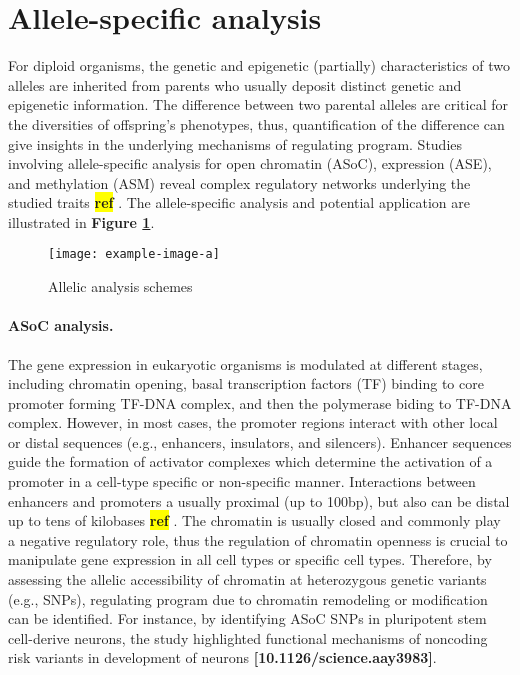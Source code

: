 \documentclass[12pt,usletter, fancy]{elegantbook}
\newcommand{\reqref}[1][ref]{
  \colorbox{yellow}{\textbf{#1}}
}
\begin{document}
\section*{Allele-specific analysis}
For diploid organisms, the genetic and epigenetic (partially) characteristics of two alleles are inherited from parents who usually deposit distinct genetic and epigenetic information.
The difference between two parental alleles are critical for the diversities of offspring's phenotypes, thus, quantification of the difference can give insights in the underlying mechanisms of regulating program.
Studies involving allele-specific analysis for open chromatin (ASoC), expression (ASE), and methylation (ASM) reveal complex regulatory networks underlying the studied traits\reqref.
The allele-specific analysis and potential application are illustrated in \textbf{Figure \ref{fig:example-image-a}}.
\begin{figure}[h]
  \centering
  \texttt{[image: example-image-a]}
  \vspace*{0.2cm}
  \caption{Allelic analysis schemes}
  \label{fig:example-image-a}
\end{figure}
\paragraph*{ASoC analysis.} The gene expression in eukaryotic organisms is modulated at different stages, including chromatin opening, basal transcription factors (TF) binding to core promoter forming TF-DNA complex, and then the polymerase biding to TF-DNA complex.
However, in most cases, the promoter regions interact with other local or distal sequences (e.g., enhancers, insulators, and silencers).
Enhancer sequences guide the formation of activator complexes which determine the activation of a promoter in a cell-type specific or non-specific manner.
Interactions between enhancers and promoters a usually proximal (up to 100bp), but also can be distal up to tens of kilobases\reqref.
The chromatin is usually closed and commonly play a negative regulatory role, thus the regulation of chromatin openness is crucial to manipulate gene expression in all cell types or specific cell types.
Therefore, by assessing the allelic accessibility of chromatin at heterozygous genetic variants (e.g., SNPs), regulating program due to chromatin remodeling or modification can be identified.
For instance, by identifying ASoC SNPs in pluripotent stem cell-derive neurons, the study highlighted functional mechanisms of noncoding risk variants in development of neurons \textbf{[10.1126/science.aay3983]}.
\end{document}
